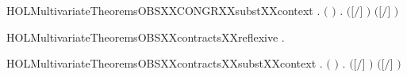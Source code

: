 \newcommand{\HOLMultivariateTheoremsLISTXXRELXXequivalence}{\UseVerbatim{HOLMultivariateTheoremsLISTXXRELXXequivalence}}
\begin{SaveVerbatim}{HOLMultivariateTheoremsOBSXXCONGRXXsubstXXcontext}
\HOLTokenTurnstile{} \HOLSymConst{\HOLTokenForall{}}  .
         \HOLSymConst{\HOLTokenConj{}} \ensuremath{(}  \HOLSymConst{\ensuremath{=}}  \ensuremath{)} \HOLSymConst{\HOLTokenConj{}}
          \HOLSymConst{\HOLTokenImp{}}
       \HOLSymConst{\HOLTokenForall{}}.    \HOLSymConst{\HOLTokenImp{}}  \ensuremath{(}\ensuremath{[}\ensuremath{/}\ensuremath{]} \ensuremath{)} \ensuremath{(}\ensuremath{[}\ensuremath{/}\ensuremath{]} \ensuremath{)}
\end{SaveVerbatim}
\newcommand{\HOLMultivariateTheoremsOBSXXCONGRXXsubstXXcontext}{\UseVerbatim{HOLMultivariateTheoremsOBSXXCONGRXXsubstXXcontext}}
\begin{SaveVerbatim}{HOLMultivariateTheoremsOBSXXcontractsXXreflexive}
\HOLTokenTurnstile{} \HOLSymConst{\HOLTokenForall{}}.   
\end{SaveVerbatim}
\newcommand{\HOLMultivariateTheoremsOBSXXcontractsXXreflexive}{\UseVerbatim{HOLMultivariateTheoremsOBSXXcontractsXXreflexive}}
\begin{SaveVerbatim}{HOLMultivariateTheoremsOBSXXcontractsXXsubstXXcontext}
\HOLTokenTurnstile{} \HOLSymConst{\HOLTokenForall{}}  .
         \HOLSymConst{\HOLTokenConj{}} \ensuremath{(}  \HOLSymConst{\ensuremath{=}}  \ensuremath{)} \HOLSymConst{\HOLTokenConj{}}
          \HOLSymConst{\HOLTokenImp{}}
       \HOLSymConst{\HOLTokenForall{}}.    \HOLSymConst{\HOLTokenImp{}}  \ensuremath{(}\ensuremath{[}\ensuremath{/}\ensuremath{]} \ensuremath{)} \ensuremath{(}\ensuremath{[}\ensuremath{/}\ensuremath{]} \ensuremath{)}
\end{SaveVerbatim}
